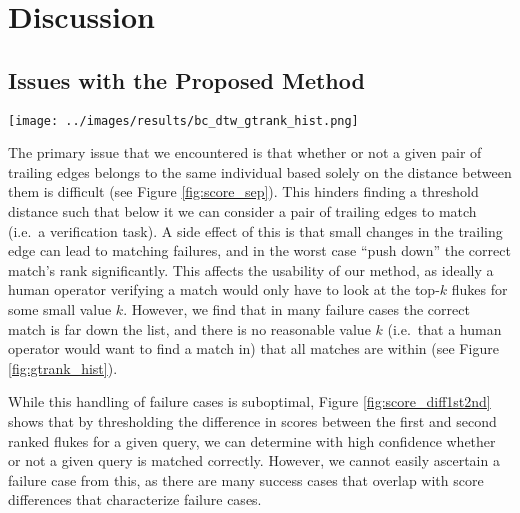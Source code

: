 
\chapter{Discussion} \label{sec:discussion}

\section{Issues with the Proposed Method}

\begin{figure*}[t]%
\centering
\texttt{[image: ../images/results/bc\_dtw\_gtrank\_hist.png]}
\caption{\textbf{Histogram of Ground-Truth Ranks}. Note that the histogram ranges are uneven to better show the lower end of the range. In order to have all matches found within the top-$k$ matches we would have to set $k = 414$.}
\label{fig:gtrank_hist}
\end{figure*}

The primary issue that we encountered is that whether or not a given pair of trailing edges belongs to the same individual based solely on the distance between them is difficult (see Figure \ref{fig:score_sep}).
This hinders finding a threshold distance such that below it we can consider a pair of trailing edges to match (i.e.\ a verification task).
A side effect of this is that small changes in the trailing edge can lead to matching failures, and in the worst case ``push down'' the correct match's rank significantly.
This affects the usability of our method, as ideally a human operator verifying a match would only have to look at the top-$k$ flukes for some small value $k$.
However, we find that in many failure cases the correct match is far down the list, and there is no reasonable value $k$ (i.e.\ that a human operator would want to find a match in) that all matches are within (see Figure \ref{fig:gtrank_hist}). 

While this handling of failure cases is suboptimal, Figure \ref{fig:score_diff1st2nd} shows that by thresholding the difference in scores between the first and second ranked flukes for a given query, we can determine with high confidence whether or not a given query is matched correctly.
However, we cannot easily ascertain a failure case from this, as there are many success cases that overlap with score differences that characterize failure cases.


